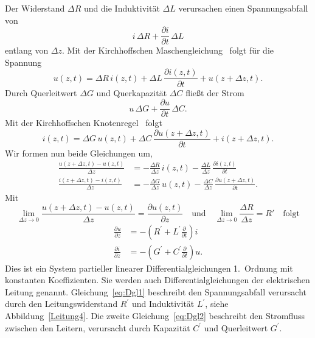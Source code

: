 \documentclass[paper=a4, parskip=half-, ngerman, fontsize=11pt]{scrreprt}
\begin{document}
Der Widerstand $\Delta R$ und die Induktivität $\Delta L$ verursachen einen Spannungsabfall von
\[
i \, \Delta R + \frac{\partial i}{\partial t} \, \Delta L
\]
entlang von $\Delta z$. Mit der Kirchhoffschen Maschengleichung~\cite{Kirchhoff} folgt für die Spannung
\begin{equation*}
u(z, t) = \Delta R \, i(z, t) + \Delta L \, \frac{\partial i(z, t)}{\partial t} + u(z + \Delta z, t).
\end{equation*}
Durch Querleitwert $\Delta G$ und Querkapazität $\Delta C$ fließt der Strom
\[
u \, \Delta G + \frac{\partial u}{\partial t} \, \Delta C.
\]
Mit der Kirchhoffschen Knotenregel~\cite{Kirchhoff} folgt
\begin{equation*}
    i(z, t) = \Delta G \, u(z, t) + \Delta C \, \frac{\partial u(z + \Delta z, t)}{\partial t} + i(z + \Delta z, t).
\end{equation*}
Wir formen nun beide Gleichungen um,
\begin{align*}
\frac{u(z + \Delta z, t) - u(z, t)}{\Delta z} &= - \frac{\Delta R}{\Delta z} \, i(z, t) - \frac{\Delta L}{\Delta z}
\,
\frac{\partial i(z, t)}{\partial t} \\
\frac{i(z + \Delta z, t) - i(z, t)}{\Delta z} &= - \frac{\Delta G}{\Delta z} \, u(z, t) - \frac{\Delta C}{\Delta z}
\, \frac{\partial u(z + \Delta z, t)}{\partial t}.
\end{align*}
Mit
\[
\lim_{\Delta z \to 0} \frac{u(z+\Delta z, t)-u(z, t)}{\Delta z} = \frac{\partial u(z, t)}{\partial z} \quad \text{und}
\quad \lim_{\Delta z \to 0} \frac{\Delta R}{\Delta z} = R' \quad \text{folgt}
\]
\begin{align}
    \frac{\partial u}{\partial z} &= -\left(R^{\prime} + L^{\prime}\frac{\partial}{\partial t}\right)i \label{eq:Dgl1}
    \\[1ex]
    \frac{\partial i}{\partial z} &= -\left(G^{\prime} + C^{\prime}\frac{\partial}{\partial t}\right)u. \label{eq:Dgl2}
\end{align}
Dies ist ein System partieller linearer Differentialgleichungen 1.~Ordnung mit konstanten Koeffizienten. Sie werden
auch Differentialgleichungen der elektrischen Leitung genannt.
Gleichung~\eqref{eq:Dgl1} beschreibt den Spannungsabfall verursacht durch den Leitungswiderstand $R^{\prime}$ und
Induktivität $L^{\prime}$, siehe Abbildung~\ref{Leitung4}.
Die zweite Gleichung~\eqref{eq:Dgl2} beschreibt den Stromfluss zwischen den Leitern, verursacht durch Kapazität
$C^{\prime}$ und Querleitwert $G^{\prime}$.
\end{document}
